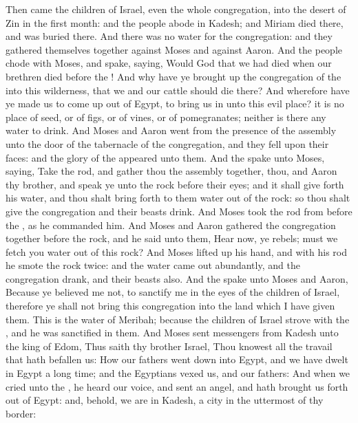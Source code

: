 \begin{biblechapter} %
 Then came the children of Israel, even the whole congregation, into the desert of Zin in the first month: and the people abode in Kadesh; and Miriam died there, and was buried there.
\verse And there was no water for the congregation: and they gathered themselves together against Moses and against Aaron.
\verse And the people chode with Moses, and spake, saying, Would God that we had died when our brethren died before the \LORD!
\verse And why have ye brought up the congregation of the \LORD into this wilderness, that we and our cattle should die there?
\verse And wherefore have ye made us to come up out of Egypt, to bring us in unto this evil place? it is no place of seed, or of figs, or of vines, or of pomegranates; neither is there any water to drink.
\verse And Moses and Aaron went from the presence of the assembly unto the door of the tabernacle of the congregation, and they fell upon their faces: and the glory of the \LORD appeared unto them.
\verse And the \LORD spake unto Moses, saying,
\verse Take the rod, and gather thou the assembly together, thou, and Aaron thy brother, and speak ye unto the rock before their eyes; and it shall give forth his water, and thou shalt bring forth to them water out of the rock: so thou shalt give the congregation and their beasts drink.
\verse And Moses took the rod from before the \LORD, as he commanded him.
\verse And Moses and Aaron gathered the congregation together before the rock, and he said unto them, Hear now, ye rebels; must we fetch you water out of this rock?
\verse And Moses lifted up his hand, and with his rod he smote the rock twice: and the water came out abundantly, and the congregation drank, and their beasts also.
\verse And the \LORD spake unto Moses and Aaron, Because ye believed me not, to sanctify me in the eyes of the children of Israel, therefore ye shall not bring this congregation into the land which I have given them.
\verse This is the water of Meribah; because the children of Israel strove with the \LORD, and he was sanctified in them.
 And Moses sent messengers from Kadesh unto the king of Edom, Thus saith thy brother Israel, Thou knowest all the travail that hath befallen us:
\verse How our fathers went down into Egypt, and we have dwelt in Egypt a long time; and the Egyptians vexed us, and our fathers:
\verse And when we cried unto the \LORD, he heard our voice, and sent an angel, and hath brought us forth out of Egypt: and, behold, we are in Kadesh, a city in the uttermost of thy border:

\end{biblechapter}
